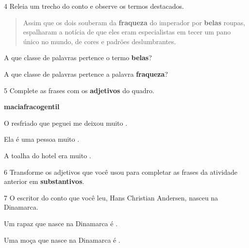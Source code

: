 \num{4} Releia um trecho do conto e observe os termos destacados.

\begin{quote}
Assim que os dois souberam da \textbf{fraqueza} do imperador por
\textbf{belas} roupas, espalharam a notícia de que eles eram
especialistas em tecer um pano único no mundo, de cores e padrões
deslumbrantes.
\end{quote}

\begin{escolha}
\item
A que classe de palavras pertence o termo \textbf{belas}?


\item
A que classe de palavras pertence a palavra \textbf{fraqueza}?

\end{escolha}

\num{5} Complete as frases com os \textbf{adjetivos} do quadro.

\begin{mdframed}[linewidth=2pt,linecolor=salmao,roundcorner=20pt]
\hfill\textbf{macia}\hfill \textbf{fraco}\hfill \textbf{gentil}\hfill
\end{mdframed}

\begin{escolha}
\item O resfriado que peguei me deixou muito .

\item Ela é uma pessoa muito .

\item A toalha do hotel era muito .
\end{escolha}

\num{6} Transforme os adjetivos que você usou para completar as frases
da atividade anterior em \textbf{substantivos}.




\num{7} O escritor do conto que você leu, Hans Christian Andersen, nasceu na Dinamarca.

\begin{escolha}
\item Um rapaz que nasce na Dinamarca é .

\item Uma moça que nasce na Dinamarca é .
\end{escolha}

